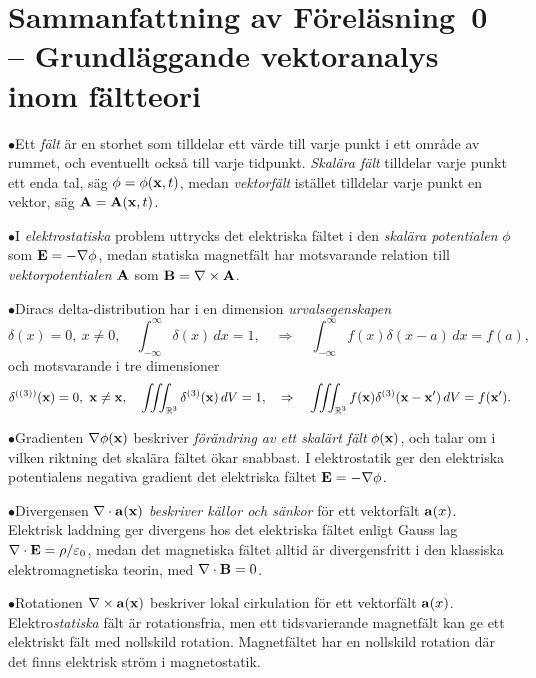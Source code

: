 \section{Sammanfattning av F{\"o}rel{\"a}sning~0 -- Grundl{\"a}ggande
  vektoranalys inom f{\"a}ltteori}
\item{$\bullet$}{Ett {\it f{\"a}lt} {\"a}r en storhet som tilldelar ett
  v{\"a}rde till varje punkt i ett omr{\aa}de av rummet, och eventuellt
  ocks{\aa} till varje tidpunkt. {\it Skal{\"a}ra f{\"a}lt} tilldelar
  varje punkt ett enda tal, s{\"a}g $\phi=\phi({\bf x},t)$, medan
  {\it vektorf{\"a}lt} ist{\"a}llet tilldelar varje punkt en vektor,
  s{\"a}g ${\bf A}={\bf A}({\bf x},t)$.}
\item{$\bullet$}{I {\it elektrostatiska} problem uttrycks det elektriska
  f{\"a}ltet i den {\it skal{\"a}ra potentialen} $\phi$ som
  ${\bf E}=-\nabla\phi$, medan statiska magnetf{\"a}lt har motsvarande
  relation till {\it vektorpotentialen} ${\bf A}$ som
  ${\bf B}=\nabla\times{\bf A}$.}
\item{$\bullet$}{Diracs delta-distribution har i en dimension
  {\it urvalsegenskapen}
  $$
    \delta(x)=0,\ x\ne0,\quad
    \int^{\infty}_{-\infty}\delta(x)\,dx=1,\quad\Rightarrow\quad
    \int^{\infty}_{-\infty}f(x)\delta(x-a)\,dx=f(a),
  $$
  och motsvarande i tre dimensioner
  $$
    \delta^{((3))}({\bf x})=0,\ {\bf x}\ne{\bf x},\quad
    \iiint_{{\Bbb R}^3}\delta^{(3)}({\bf x})\,dV=1,\quad\Rightarrow\quad
    \iiint_{{\Bbb R}^3}f({\bf x})\delta^{(3)}({\bf x}-{\bf x}')\,dV
      =f({\bf x}').
  $$}
\item{$\bullet$}{Gradienten $\nabla\phi({\bf x})$ beskriver
  {\it f{\"o}r{\"a}ndring av ett skal{\"a}rt f{\"a}lt} $\phi({\bf x})$,
  och talar om i vilken riktning det skal{\"a}ra f{\"a}ltet {\"o}kar
  snabbast. I elektrostatik ger den elektriska potentialens negativa
  gradient det elektriska f{\"a}ltet ${\bf E}=-\nabla\phi$.}
\item{$\bullet$}{Divergensen $\nabla\cdot{\bf a}({\bf x})$ {\it beskriver
  k{\"a}llor och s{\"a}nkor} f{\"o}r ett vektorf{\"a}lt ${\bf a}(x)$.
  Elektrisk laddning ger divergens hos det elektriska f{\"a}ltet enligt
  Gauss lag $\nabla\cdot{\bf E}=\rho/\varepsilon_0$, medan det magnetiska
  f{\"a}ltet alltid {\"a}r divergensfritt i den klassiska elektromagnetiska
  teorin, med $\nabla\cdot{\bf B}=0$.}
\item{$\bullet$}{Rotationen $\nabla\times{\bf a}({\bf x})$ beskriver lokal
  cirkulation f{\"o}r ett vektorf{\"a}lt ${\bf a}(x)$. Elektro{\it statiska}
  f{\"a}lt {\"a}r rotationsfria, men ett tidsvarierande magnetf{\"a}lt kan
  ge ett elektriskt f{\"a}lt med nollskild rotation. Magnetf{\"a}ltet har en
  nollskild rotation d{\"a}r det finns elektrisk str{\"o}m i magnetostatik.}
